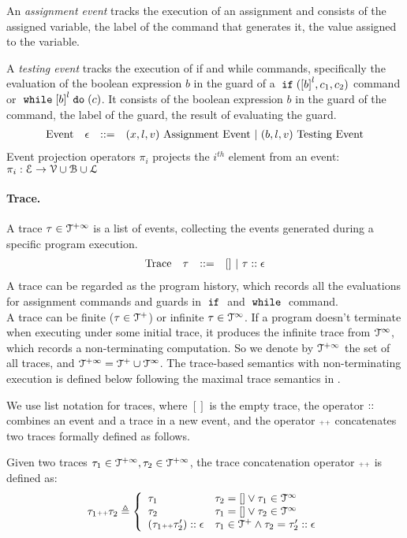  An \emph{assignment event} tracks the execution of an assignment and consists of the assigned variable, the label of the command that generates it, the value assigned to the variable.

 A \emph{testing event} tracks the execution of if and while commands, specifically the evaluation of the boolean expression $b$ in the guard of a $\eif(\clabel{b}^l, c_1, c_2)$ command or $\ewhile \clabel{b}^l \edo (c)$.
 It consists of the boolean expression $b$ in the guard of the command, the label of the guard, the result of evaluating the guard.
%
\[
\begin{array}{llll}
  \mbox{Event} 
  & \mathtt{\epsilon} & ::= & 
  ({x}, l, v) ~ \mbox{Assignment Event} 
  ~|~(b, l, v) ~ \mbox{Testing Event}
\end{array}
\]
Event projection operators $\pi_i$ projects the $i^{th}$ element from an event: 
$\pi_i : \mathcal{E} \to \mathcal{V} \cup \mathcal{B} \cup \mathcal{L} $

\paragraph{Trace.}
%
A trace $\mathtt{\tau} \in \mathcal{T}^{+\infty}$ is a list of events, 
collecting the events generated during a specific program execution. 
\[
\begin{array}{llll}
\mbox{Trace} & \mathtt{\tau}
& ::= & [] ~|~ \mathtt{\tau} :: \mathtt{\epsilon} 
\end{array}
\]
A trace can be regarded as the program history, 
which records all the evaluations for assignment commands and guards in $\;\mathtt{if}\;$ and $\;\mathtt{while}\;$ command.
\\
{
A trace can be finite ($\mathtt{\tau} \in \mathcal{T}^{+}$) or infinite $\mathtt{\tau} \in \mathcal{T}^{\infty}$.
If a program doesn't terminate when executing under some initial trace,
it produces the infinite trace 
from $\mathcal{T}^{\infty}$, which records a non-terminating computation.
So we denote by $\mathcal{T}^{+\infty}$ the set of all traces, and $\mathcal{T}^{+\infty} = \mathcal{T}^{+} \cup \mathcal{T}^{\infty}$.
The trace-based semantics with non-terminating execution is defined below following the maximal trace semantics in \cite{Cousot19}.}

We use list notation for traces, where $[]$ is the empty trace, the operator ${\small ::}$ combines an event and a trace in a new event, 
and the operator ${\scriptscriptstyle ++}$ concatenates two traces formally defined as follows. 
\begin{defn}
  \label{def:trace_concate}
Given two traces $\mathtt{\tau}_1 \in \mathcal{T}^{+\infty}, \mathtt{\tau}_2 \in \mathcal{T}^{+\infty}$, the trace concatenation operator 
${\scriptscriptstyle ++}$ is defined as:
\[
\trace_1 \tracecat \trace_2 \triangleq
\left\{
\begin{array}{ll} 
  \trace_1 & \trace_2 = [] \lor \trace_1 \in \inftdom \\
  \trace_2 & \trace_1 = [] \lor \trace_2 \in \inftdom \\
  (\trace_1   \tracecat \trace_2'):: \event & \trace_1 \in \ftdom \land \trace_2 = \trace_2' :: \event
\end{array}
\right.
\]
\end{defn}


